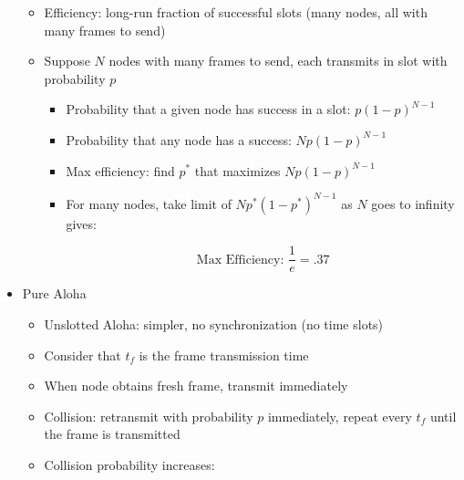\begin{itemize}
    \begin{itemize}

      \item Efficiency: long-run fraction of successful slots (many nodes, all with many frames to send)

      \item Suppose $N$ nodes with many frames to send, each transmits in slot with probability $p$

        \begin{itemize}

          \item Probability that a given node has success in a slot: $p(1-p)^{N-1}$

          \item Probability that any node has a success: $Np(1-p)^{N-1}$

          \item Max efficiency: find $p^*$ that maximizes $Np(1-p)^{N-1}$

          \item For many nodes, take limit of $Np^*(1-p^*)^{N-1}$ as $N$ goes to infinity gives:

            $$\text{Max Efficiency: }\frac{1}{e}=.37$$

        \end{itemize}

    \end{itemize}

  \item Pure Aloha

    \begin{itemize}

      \item Unslotted Aloha: simpler, no synchronization (no time slots)

      \item Consider that $t_f$ is the frame transmission time

      \item When node obtains fresh frame, transmit immediately
        
      \item Collision: retransmit with probability $p$ immediately, repeat every $t_f$ until the frame is transmitted

      \item Collision probability increases:

        \begin{itemize}


\end{itemize}
\end{itemize}
\end{itemize}

